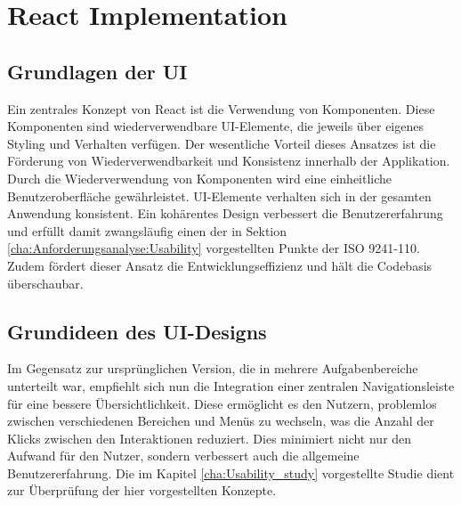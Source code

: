 \section{React Implementation}

\subsection{Grundlagen der UI}
\label{sec:reactUI}
Ein zentrales Konzept von React ist die Verwendung von Komponenten. Diese Komponenten sind wiederverwendbare UI-Elemente, die jeweils über eigenes Styling und Verhalten verfügen. 
Der wesentliche Vorteil dieses Ansatzes ist die Förderung von Wiederverwendbarkeit und Konsistenz innerhalb der Applikation. Durch die Wiederverwendung von Komponenten wird eine einheitliche Benutzeroberfläche 
gewährleistet. UI-Elemente verhalten sich in der gesamten Anwendung konsistent. Ein kohärentes Design verbessert die Benutzererfahrung und erfüllt damit zwangsläufig einen der in Sektion \ref{cha:Anforderungsanalyse:Usability} 
vorgestellten Punkte der ISO 9241-110. Zudem fördert dieser Ansatz die Entwicklungseffizienz und hält die Codebasis überschaubar.

\subsection{Grundideen des UI-Designs}
Im Gegensatz zur ursprünglichen Version, die in mehrere Aufgabenbereiche unterteilt war, empfiehlt sich nun die Integration einer zentralen Navigationsleiste für eine bessere Übersichtlichkeit. Diese ermöglicht es den Nutzern, 
problemlos zwischen verschiedenen Bereichen und Menüs zu wechseln, was die Anzahl der Klicks zwischen den Interaktionen reduziert. Dies minimiert nicht nur den Aufwand für den Nutzer, sondern verbessert auch die allgemeine Benutzererfahrung. 
Die im Kapitel \ref{cha:Usability_study} vorgestellte Studie dient zur Überprüfung der hier vorgestellten Konzepte.

